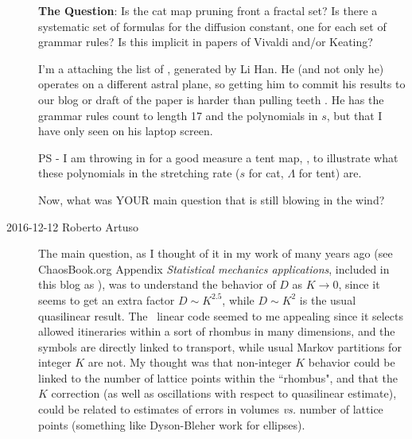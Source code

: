 \begin{description}
{\noindent
\textbf{The Question}:
      Is the cat map pruning front a fractal set? Is there a systematic set
      of formulas for the diffusion constant, one for each set of grammar
      rules? Is this implicit in papers of Vivaldi and/or Keating?

I'm a attaching the list of , generated by Li Han.
He (and not only he) operates on a different astral plane, so getting him to
commit his results to our blog or draft of the paper is harder than pulling
teeth . He has the grammar rules count to length 17 and the polynomials in
$s$, but that I have only seen on his laptop screen.

PS - I am throwing in for a good measure a tent map,
, to illustrate what these polynomials in the
stretching rate ($s$ for cat, $\Lambda$ for tent) are.

Now, what was YOUR main question that is still blowing in the wind?
    }

\item[2016-12-12 Roberto Artuso]
The main question, as I thought of it in my work of many years
ago (see ChaosBook.org Appendix {\em Statistical mechanics
applications}, included in this blog as ), was to
understand the behavior of $D$ as $K \to 0$, since it seems to get an extra
factor $D\sim K^{2.5}$, while $D\sim K^2$ is the usual quasilinear result.
The \PV\ linear code seemed to me appealing since it selects
allowed itineraries within a sort of rhombus in many dimensions, and the
symbols are directly linked to transport, while usual Markov partitions for
integer $K$ are not. My thought was that non-integer $K$ behavior could be
linked to the number of lattice points within the ``rhombus", and that the
$K$ correction (as well as oscillations with respect to quasilinear
estimate), could be related to estimates of errors in volumes \emph{vs.}
number of lattice points (something like
Dyson-Bleher work for ellipses).




\end{description}
